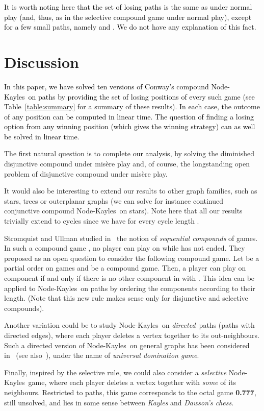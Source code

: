 \documentclass[11pt]{article}
\newcommand{\modif}[1]{\textcolor{black}{#1}}
\newcommand{\NK}{Node-Kayles}
\begin{document}
\modif{It is worth noting here that the set of losing
paths is the same as under normal play (and, thus, as in
the selective compound game under normal play), except for a few
small paths, namely 
and . We do not have any explanation of this fact.}

\section{Discussion}
\label{sec:discussion}

\modif{
In this paper, we have solved ten versions of Conway's compound
\NK\ on paths by providing the set of losing positions of every
such game (see Table~\ref{table:summary} for a summary of these results). 
In each case, the outcome of any position can be
computed in linear time. The question of finding a
losing option from any winning position (which gives the winning
strategy) can as well be solved
in linear time. 
}

\begin{table}

\caption{\label{table:summary}Losing positions for compound \NK\ on paths}
\end{table}

The first natural question is to complete \modif{our analysis}, 
by solving the diminished disjunctive
compound under mis\`ere play and, of course, the longstanding
open problem of disjunctive compound under mis\`ere play.

It would also be interesting to extend our results to other
graph families, such as stars, trees or outerplanar graphs
(we can solve for instance continued conjunctive compound
\NK\ on stars).
Note here that all our results trivially extend to cycles
since we have  for every cycle length
.

Stromquist and Ullman studied in~\cite{STROMQUIST-ULLMAN-1993}
the notion of {\em sequential compounds} of games. In such
a compound game , no player can play on 
while  has not ended. They proposed as an open question to
consider the following compound game. Let  be a partial order on games
and  be a compound game. Then,
a player can play on component  if and only if there is no
other component  in  with . This idea can be
applied to \NK\ on paths by ordering the components according
to their length. (Note that this new rule makes sense only for
disjunctive and selective compounds).

Another variation could be to study \NK\ on {\em directed\,}
paths (paths with directed edges), where each player deletes
a vertex together to its out-neighbours.
Such a directed version of \NK\ on general graphs has been considered
in~\cite{DUCHENE-GRAVIER-MHALLA-08} (see also~\cite{PHD-DUCHENE}), 
under the name of
{\em universal domination game}.

Finally, inspired by the selective rule, we could also consider
a {\em selective} \NK\ game, where each player deletes a vertex
together with {\em some} of its neighbours.
Restricted to paths, this game corresponds to the
octal game {\bf 0.777}, still unsolved, and lies in some sense between
{\em Kayles} and {\em Dawson's chess}.




\end{document}

